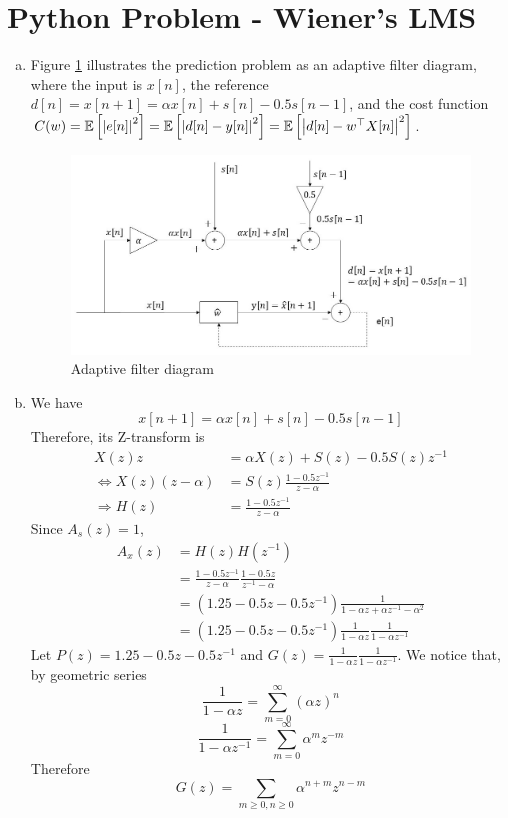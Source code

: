 \section{Python Problem - Wiener's LMS}\label{sec:p5}

\begin{enumerate}[(a)]
\item Figure \ref{fig:p5a} illustrates the prediction problem as an adaptive filter diagram, where the input is $x[n]$, the reference $d[n] = x[n+1] = \alpha x[n] + s[n] - 0.5 s[n-1]$, and the cost function $C(w) = \mathbb{E} \left[ \left\lvert e[n] \right\rvert^2 \right] = \mathbb{E} \left[ \left\lvert d[n] - y[n] \right\rvert^2 \right] = \mathbb{E} \left[ \left\lvert d[n] - w^\top X[n] \right\rvert^2 \right]$.
\begin{figure}[htbp]
	\centering
	\includegraphics[width=\textwidth]{images/p5a}
	\caption{Adaptive filter diagram}
	\label{fig:p5a}
\end{figure}

\item 
We have \[x[n+1] = \alpha x[n] + s[n] - 0.5 s[n-1]\] Therefore, its Z-transform is
\begin{align*}
	X(z)z &= \alpha X(z) + S(z) -0.5 S(z) z^{-1} \\
	\Leftrightarrow X(z)(z-\alpha) &= S(z) \frac{1 - 0.5 z^{-1}}{z - \alpha} \\
	\Rightarrow H(z) &= \frac{1 - 0.5 z^{-1}}{z - \alpha}
\end{align*}
Since $A_s(z) = 1$,
\begin{align*}
	A_x(z)
	&= H(z)H(z^{-1}) \\
	&= \frac{1 - 0.5 z^{-1}}{z - \alpha} \frac{1 - 0.5 z}{z^{-1} - \alpha} \\
	&= (1.25 - 0.5z - 0.5z^{-1})\frac{1}{1 - \alpha z + \alpha z^{-1} - \alpha^2}\\
	&= (1.25 - 0.5z - 0.5z^{-1})\frac{1}{1 - \alpha z}\frac{1}{1 - \alpha z^{-1}}
\end{align*}
Let $P(z) = 1.25 - 0.5z - 0.5z^{-1}$ and $G(z) = \frac{1}{1 - \alpha z}\frac{1}{1 - \alpha z^{-1}}$. We notice that, by geometric series
\[\frac{1}{1 - \alpha z} = \sum_{m=0}^{\infty}(\alpha z)^n\]
\[\frac{1}{1 - \alpha z^{-1}} = \sum_{m=0}^{\infty}\alpha^m z^{-m}\]
Therefore
\[G(z) = \sum_{m \geq 0, n \geq 0} \alpha^{n+m} z^{n-m}\]


\end{enumerate}
